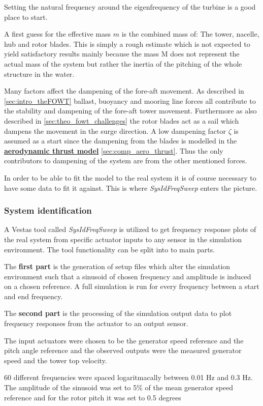Setting the natural frequency around the eigenfrequency of the turbine is a good place to start. 

A first guess for the effective mass $ m $ is the combined mass of: The tower, nacelle, hub and rotor blades. This is simply a rough estimate which is not expected to yield satisfactory results mainly because the mass M does not represent the actual mass of the system but rather the inertia of the pitching of the whole structure in the water. 

Many factors affect the dampening of the fore-aft movement. As described in \cref{sec:intro_theFOWT} ballast, buoyancy and mooring line forces all contribute to the stability and dampening of the fore-aft tower movement. Furthermore as also described in \cref{sec:theo_fowt_challenges} the rotor blades act as a sail which dampens the movement in the surge direction. A low dampening factor $ \zeta $ is assumed as a start since the dampening from the blades is modelled in the \hyperref[sec:comp_aero_thrust]{\textbf{aerodynamic thrust model}} \cref{sec:comp_aero_thrust}. Thus the only contributors to dampening of the system are from the other mentioned forces.

\medskip
In order to be able to fit the model to the real system it is of course necessary to have some data to fit it against. This is where \textit{SysIdFreqSweep} enters the picture.

\subsubsection{System identification}
A Vestas tool called \textit{SysIdFreqSweep} is utilized to get frequency response plots of the real system from specific actuator inputs to any sensor in the simulation environment. The tool functionality can be split into to main parts. 

The \textbf{first part} is the generation of setup files which alter the simulation environment such that a sinusoid of chosen frequency and amplitude is induced on a chosen reference. A full simulation is run for every frequency between a start and end frequency. 

The \textbf{second part} is the processing of the simulation output data to plot frequency responses from the actuator to an output sensor. 

\medskip
The input actuators were chosen to be the generator speed reference and the pitch angle reference and the observed outputs were the measured generator speed and the tower top velocity.

60 different frequencies were spaced logaritmacally between 0.01 Hz and 0.3 Hz. The amplitude of the sinusoid was set to 5\% of the mean generator speed reference and for the rotor pitch it was set to 0.5 degrees 
